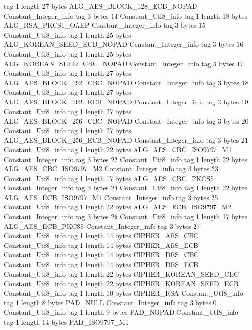 {{{			tag	1
			length	27
			bytes	ALG_AES_BLOCK_128_ECB_NOPAD
		}
		Constant_Integer_info {
			tag	3
			bytes	14
		}
		Constant_Utf8_info {
			tag	1
			length	18
			bytes	ALG_RSA_PKCS1_OAEP
		}
		Constant_Integer_info {
			tag	3
			bytes	15
		}
		Constant_Utf8_info {
			tag	1
			length	25
			bytes	ALG_KOREAN_SEED_ECB_NOPAD
		}
		Constant_Integer_info {
			tag	3
			bytes	16
		}
		Constant_Utf8_info {
			tag	1
			length	25
			bytes	ALG_KOREAN_SEED_CBC_NOPAD
		}
		Constant_Integer_info {
			tag	3
			bytes	17
		}
		Constant_Utf8_info {
			tag	1
			length	27
			bytes	ALG_AES_BLOCK_192_CBC_NOPAD
		}
		Constant_Integer_info {
			tag	3
			bytes	18
		}
		Constant_Utf8_info {
			tag	1
			length	27
			bytes	ALG_AES_BLOCK_192_ECB_NOPAD
		}
		Constant_Integer_info {
			tag	3
			bytes	19
		}
		Constant_Utf8_info {
			tag	1
			length	27
			bytes	ALG_AES_BLOCK_256_CBC_NOPAD
		}
		Constant_Integer_info {
			tag	3
			bytes	20
		}
		Constant_Utf8_info {
			tag	1
			length	27
			bytes	ALG_AES_BLOCK_256_ECB_NOPAD
		}
		Constant_Integer_info {
			tag	3
			bytes	21
		}
		Constant_Utf8_info {
			tag	1
			length	22
			bytes	ALG_AES_CBC_ISO9797_M1
		}
		Constant_Integer_info {
			tag	3
			bytes	22
		}
		Constant_Utf8_info {
			tag	1
			length	22
			bytes	ALG_AES_CBC_ISO9797_M2
		}
		Constant_Integer_info {
			tag	3
			bytes	23
		}
		Constant_Utf8_info {
			tag	1
			length	17
			bytes	ALG_AES_CBC_PKCS5
		}
		Constant_Integer_info {
			tag	3
			bytes	24
		}
		Constant_Utf8_info {
			tag	1
			length	22
			bytes	ALG_AES_ECB_ISO9797_M1
		}
		Constant_Integer_info {
			tag	3
			bytes	25
		}
		Constant_Utf8_info {
			tag	1
			length	22
			bytes	ALG_AES_ECB_ISO9797_M2
		}
		Constant_Integer_info {
			tag	3
			bytes	26
		}
		Constant_Utf8_info {
			tag	1
			length	17
			bytes	ALG_AES_ECB_PKCS5
		}
		Constant_Integer_info {
			tag	3
			bytes	27
		}
		Constant_Utf8_info {
			tag	1
			length	14
			bytes	CIPHER_AES_CBC
		}
		Constant_Utf8_info {
			tag	1
			length	14
			bytes	CIPHER_AES_ECB
		}
		Constant_Utf8_info {
			tag	1
			length	14
			bytes	CIPHER_DES_CBC
		}
		Constant_Utf8_info {
			tag	1
			length	14
			bytes	CIPHER_DES_ECB
		}
		Constant_Utf8_info {
			tag	1
			length	22
			bytes	CIPHER_KOREAN_SEED_CBC
		}
		Constant_Utf8_info {
			tag	1
			length	22
			bytes	CIPHER_KOREAN_SEED_ECB
		}
		Constant_Utf8_info {
			tag	1
			length	10
			bytes	CIPHER_RSA
		}
		Constant_Utf8_info {
			tag	1
			length	8
			bytes	PAD_NULL
		}
		Constant_Integer_info {
			tag	3
			bytes	0
		}
		Constant_Utf8_info {
			tag	1
			length	9
			bytes	PAD_NOPAD
		}
		Constant_Utf8_info {
			tag	1
			length	14
			bytes	PAD_ISO9797_M1
}}}
